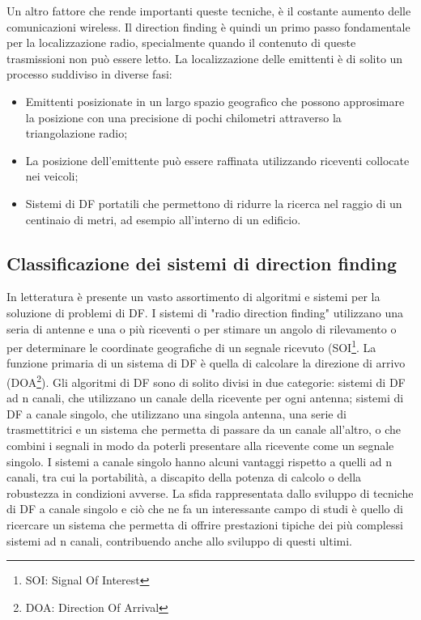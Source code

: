Un altro fattore che rende importanti queste tecniche, è il costante aumento delle comunicazioni wireless. Il direction finding è quindi un primo passo fondamentale per la localizzazione radio, specialmente quando il contenuto di queste trasmissioni non può essere letto. La localizzazione delle emittenti è di solito un processo suddiviso in diverse fasi: 
\begin{itemize}
\item Emittenti posizionate in un largo spazio geografico che possono approsimare la posizione con una precisione di pochi chilometri attraverso la triangolazione radio;
\item La posizione dell'emittente può essere raffinata utilizzando riceventi collocate nei veicoli; 
\item Sistemi di DF portatili che permettono di ridurre la ricerca nel raggio di un centinaio di metri, ad esempio all'interno di un edificio.
\end{itemize}


\subsection{Classificazione dei sistemi di direction finding}

In letteratura è presente un vasto assortimento di algoritmi e sistemi per la soluzione di problemi di DF.
I sistemi di "radio direction finding" utilizzano una seria di antenne e una o più riceventi o per stimare un angolo di rilevamento o per determinare le coordinate geografiche di un segnale ricevuto (SOI\footnote{SOI: Signal Of Interest}. La funzione primaria di un sistema di DF è quella di calcolare la direzione di arrivo (DOA\footnote{DOA: Direction Of Arrival}). 
Gli algoritmi di DF sono di solito divisi in due categorie: sistemi di DF ad n canali, che utilizzano un canale della ricevente per ogni antenna; sistemi di DF a canale singolo, che utilizzano una singola antenna, una serie di trasmettitrici e un sistema che permetta di passare da un canale all'altro, o che combini i segnali in modo da poterli presentare alla ricevente come un segnale singolo. I sistemi a canale singolo hanno alcuni vantaggi rispetto a quelli ad n canali, tra cui la portabilità, a discapito della potenza di calcolo o della robustezza in condizioni avverse. La sfida rappresentata dallo sviluppo di tecniche di DF a canale singolo e ciò che ne fa un interessante campo di studi è quello di ricercare un sistema che permetta di offrire prestazioni tipiche dei più complessi sistemi ad n canali, contribuendo anche allo sviluppo di questi ultimi.

